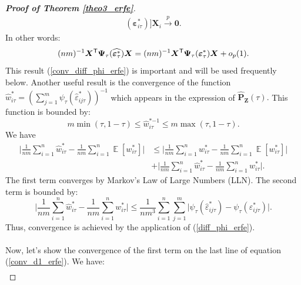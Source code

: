 \documentclass[15pt,a4paper]{article}
\DeclareMathOperator{\E}{\mathbb{E}}
\newcommand{\transpose}{{}^{\text{\sffamily T}}}
\newcommand{\smallO}{o}
\begin{document}
\begin{proof}[\textbf{Proof of Theorem \ref{theo3_erfe}}]
\begin{equation*}
\begin{split}
    (\boldsymbol{\varepsilon}^{*}_{i\tau})]\boldsymbol{X}_i \xrightarrow{p} \boldsymbol{0}.
\end{split}
\end{equation*}
In other words:
\begin{equation}\label{conv_diff_phi_erfe}
(nm)^{-1}\boldsymbol{X}\transpose\boldsymbol{\Psi}_{\tau}(\widehat{\boldsymbol{\varepsilon}^{*}_{\tau}})\boldsymbol{X} = (nm)^{-1}\boldsymbol{X}\transpose\boldsymbol{\Psi}_{\tau}(\boldsymbol{\varepsilon}^{*}_{\tau})\boldsymbol{X} + \smallO_{p}(1). 
\end{equation}
This result (\ref{conv_diff_phi_erfe}) is important and will be used frequently below. Another useful result is the convergence of the function $\widehat{w}^{*}_{i\tau}=(\sum_{j=1}^{m}\psi_{\tau}(\widehat{\varepsilon}^{*}_{ij\tau}))^{-1}$ which appears in the expression of $ \widehat{\boldsymbol{P}}_{\boldsymbol{Z}}(\tau).$ This function is bounded by:
\begin{equation*}
 m \min(\tau,1-\tau)\leq\widehat{w}^{*{-1}}_{i\tau}\leq m \max(\tau,1-\tau).
\end{equation*}
We have 
\begin{equation}\label{conv_poids_erfe} 
    \begin{split}
        \Big\lvert \frac{1}{nm}\sum_{i=1}^{n} \widehat{w}^{*}_{i\tau} - \frac{1}{nm}\sum_{i=1}^{n} \E[w^{*}_{i\tau}] \Big\rvert & \leq 
        \Big\lvert \frac{1}{nm}\sum_{i=1}^{n} w^{*}_{i\tau} - \frac{1}{nm}\sum_{i=1}^{n} \E[w^{*}_{i\tau}] \Big\rvert \\
        & + \Big\lvert \frac{1}{nm}\sum_{i=1}^{n} \widehat{w}^{*}_{i\tau} - \frac{1}{nm}\sum_{i=1}^{n} w^{*}_{i\tau}\Big\rvert. 
    \end{split}
\end{equation}
The first term converges by Markov's Law of Large Numbers (LLN). The second term is bounded by:
\begin{equation*}
    \Big\lvert \frac{1}{nm}\sum_{i=1}^{n} \widehat{w}^{*}_{i\tau} - \frac{1}{nm}\sum_{i=1}^{n} w^{*}_{i\tau}\Big\rvert \leq \frac{1}{nm^3}\sum_{i=1}^{n}\sum_{j=1}^{m}\lvert\psi_{\tau}(\widehat{\varepsilon}^{*}_{ij\tau})-\psi_{\tau}(\varepsilon^{*}_{ij\tau})\rvert.
\end{equation*}
Thus, convergence is achieved by the application of (\ref{diff_phi_erfe}).
 ~~\\
 ~~\\
Now, let's show the convergence of the first term on the last line of equation (\ref{conv_d1_erfe}). We have:
\begin{align}\label{first_d1_term_conv_erfe}

\end{align}
\end{proof}
\end{document}
